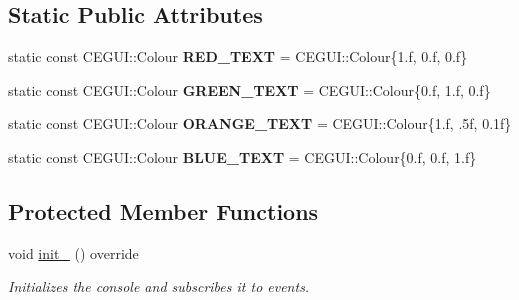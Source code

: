 \subsection*{Static Public Attributes}
\begin{DoxyCompactItemize}
\item 
static const C\+E\+G\+U\+I\+::\+Colour {\bfseries R\+E\+D\+\_\+\+T\+E\+XT} = C\+E\+G\+U\+I\+::\+Colour\{1.f, 0.f, 0.f\}\hypertarget{class_console_a1ebb9fe43b05ce219b7c1e321435aa04}{}\label{class_console_a1ebb9fe43b05ce219b7c1e321435aa04}

\item 
static const C\+E\+G\+U\+I\+::\+Colour {\bfseries G\+R\+E\+E\+N\+\_\+\+T\+E\+XT} = C\+E\+G\+U\+I\+::\+Colour\{0.f, 1.f, 0.f\}\hypertarget{class_console_a74d53b40493337aa9fa3c283ad09f725}{}\label{class_console_a74d53b40493337aa9fa3c283ad09f725}

\item 
static const C\+E\+G\+U\+I\+::\+Colour {\bfseries O\+R\+A\+N\+G\+E\+\_\+\+T\+E\+XT} = C\+E\+G\+U\+I\+::\+Colour\{1.f, .\+5f, 0.\+1f\}\hypertarget{class_console_a8ddeb8af000da673295852d9f3504099}{}\label{class_console_a8ddeb8af000da673295852d9f3504099}

\item 
static const C\+E\+G\+U\+I\+::\+Colour {\bfseries B\+L\+U\+E\+\_\+\+T\+E\+XT} = C\+E\+G\+U\+I\+::\+Colour\{0.f, 0.f, 1.f\}\hypertarget{class_console_adb65ead268c66f0b337716bd5a8ca5cd}{}\label{class_console_adb65ead268c66f0b337716bd5a8ca5cd}

\end{DoxyCompactItemize}
\subsection*{Protected Member Functions}
\begin{DoxyCompactItemize}
\item 
void \hyperlink{class_console_a55d92d149dba54c67855540d5e37c9f2}{init\+\_\+} () override
\begin{DoxyCompactList}\small\item\em Initializes the console and subscribes it to events. \end{DoxyCompactList}\end{DoxyCompactItemize}
